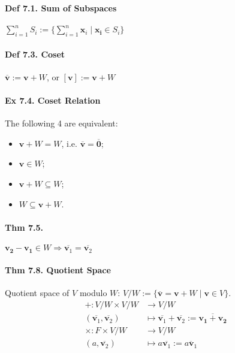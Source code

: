 \paragraph{Def 7.1. Sum of Subspaces}$\sum_{i=1}^nS_i:=\{\sum_{i=1}^n\mathbf{x}_i\mid \mathbf{x_i}\in S_i\}$

\paragraph{Def 7.3. Coset} $\overline{\mathbf{v}}:=\mathbf{v}+W$, or $[\mathbf{v}]:=\mathbf{v}+W$

\paragraph{Ex 7.4. Coset Relation} The following 4 are equivalent:
\begin{multicols}{2}
\begin{itemize}[noitemsep,nolistsep]
    \item $\mathbf{v} + W = W$, i.e. $\overline{\mathbf{v}}=\overline{\mathbf{0}}$;
    \item $\mathbf{v}\in W$;
    \item $\mathbf{v} + W \subseteq W$;
    \item $W \subseteq \mathbf{v} + W$.
\end{itemize}
\end{multicols}

\paragraph{Thm 7.5.} $\mathbf{v_2}-\mathbf{v_1}\in W \Rightarrow \overline{\mathbf{v}_1}=\overline{\mathbf{v}_2}$ 

\paragraph{Thm 7.8. Quotient Space} Quotient space of $V$ modulo $W$:
$V/W := \{\overline{\mathbf{v}}=\mathbf{v}+W\mid \mathbf{v}\in V\}$.
$$\begin{aligned}
+:V/W\times V/W &\rightarrow V/W \\
(\overline{\mathbf{v}_1}, \overline{\mathbf{v}_2}) & \mapsto \overline{\mathbf{v}_1} + \overline{\mathbf{v}_2} :=\overline{\mathbf{v_\text{1}+v_\text{2}}} \\
\times:F\times V/W &\rightarrow V/W \\
(a, \overline{\mathbf{v}_2}) & \mapsto a\overline{\mathbf{v}_1} := \overline{a\mathbf{v}_1}
\end{aligned}$$

